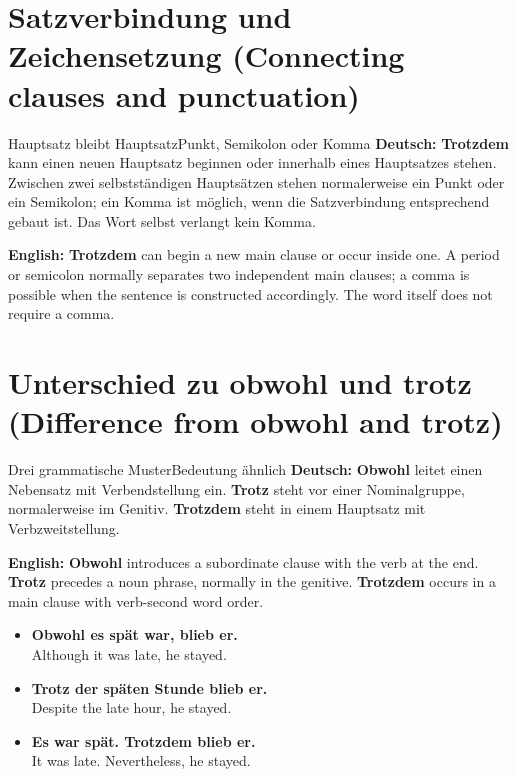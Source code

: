 \documentclass[a4paper,11pt]{article}
\newcommand{\GermanText}[1]{\textbf{Deutsch: }#1\par}\newcommand{\EnglishText}[1]{{\small\color{SoftGray}\textbf{English: }#1\par}}\newcommand{\ExampleItem}[2]{\item \textbf{#1}\\{\small\color{SoftGray}#2}}
\begin{document}
\section{Satzverbindung und Zeichensetzung \textnormal{(Connecting clauses and punctuation)}}
\begin{grammarentry}{Hauptsatz bleibt Hauptsatz}{Punkt, Semikolon oder Komma}
\GermanText{\textbf{Trotzdem} kann einen neuen Hauptsatz beginnen oder innerhalb eines Hauptsatzes stehen. Zwischen zwei selbstständigen Hauptsätzen stehen normalerweise ein Punkt oder ein Semikolon; ein Komma ist möglich, wenn die Satzverbindung entsprechend gebaut ist. Das Wort selbst verlangt kein Komma.}
\EnglishText{\textbf{Trotzdem} can begin a new main clause or occur inside one. A period or semicolon normally separates two independent main clauses; a comma is possible when the sentence is constructed accordingly. The word itself does not require a comma.}
\end{grammarentry}

\section{Unterschied zu \glqq obwohl\grqq{} und \glqq trotz\grqq{} \textnormal{(Difference from \glqq obwohl\grqq{} and \glqq trotz\grqq)}}
\begin{grammarentry}{Drei grammatische Muster}{Bedeutung ähnlich}
\GermanText{\textbf{Obwohl} leitet einen Nebensatz mit Verbendstellung ein. \textbf{Trotz} steht vor einer Nominalgruppe, normalerweise im Genitiv. \textbf{Trotzdem} steht in einem Hauptsatz mit Verbzweitstellung.}
\EnglishText{\textbf{Obwohl} introduces a subordinate clause with the verb at the end. \textbf{Trotz} precedes a noun phrase, normally in the genitive. \textbf{Trotzdem} occurs in a main clause with verb-second word order.}
\end{grammarentry}
\begin{exbox}\begin{itemize}
\ExampleItem{Obwohl es spät war, blieb er.}{Although it was late, he stayed.}
\ExampleItem{Trotz der späten Stunde blieb er.}{Despite the late hour, he stayed.}
\ExampleItem{Es war spät. Trotzdem blieb er.}{It was late. Nevertheless, he stayed.}
\end{itemize}\end{exbox}
\end{document}

